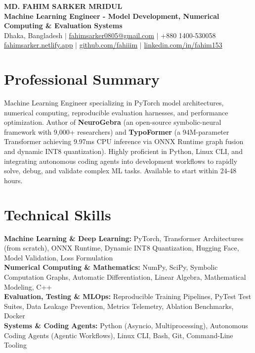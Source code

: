 \documentclass[9.5pt,a4paper]{article}
\begin{document}
{\centering
    {\Large \textbf{MD. FAHIM SARKER MRIDUL}}\\[1pt]
    \textbf{Machine Learning Engineer - Model Development, Numerical Computing \& Evaluation Systems}\\[1pt]
    Dhaka, Bangladesh \;$\vert$\; \href{mailto:fahimsarker0805@gmail.com}{fahimsarker0805@gmail.com} \;$\vert$\; +880 1400-530058\\[1pt]
    \href{https://fahimsarker.netlify.app}{fahimsarker.netlify.app} \;$\vert$\; \href{https://github.com/fahiiim}{github.com/fahiiim} \;$\vert$\; \href{https://linkedin.com/in/fahim153}{linkedin.com/in/fahim153}\par
}

\vspace{-4pt}
\section*{Professional Summary}
Machine Learning Engineer specializing in PyTorch model architectures, numerical computing, reproducible evaluation harnesses, and performance optimization. Author of \textbf{NeuroGebra} (an open-source symbolic-neural framework with 9,000+ researchers) and \textbf{TypoFormer} (a 94M-parameter Transformer achieving 9.97ms CPU inference via ONNX Runtime graph fusion and dynamic INT8 quantization). Highly proficient in Python, Linux CLI, and integrating autonomous coding agents into development workflows to rapidly solve, debug, and validate complex ML tasks. Available to start within 24-48 hours.

\section*{Technical Skills}
\noindent
\textbf{Machine Learning \& Deep Learning:} PyTorch, Transformer Architectures (from scratch), ONNX Runtime, Dynamic INT8 Quantization, Hugging Face, Model Validation, Loss Formulation\\
\textbf{Numerical Computing \& Mathematics:} NumPy, SciPy, Symbolic Computation Graphs, Automatic Differentiation, Linear Algebra, Mathematical Modeling, C++\\
\textbf{Evaluation, Testing \& MLOps:} Reproducible Training Pipelines, PyTest Test Suites, Data Leakage Prevention, Metrics Telemetry, Ablation Benchmarks, Docker\\
\textbf{Systems \& Coding Agents:} Python (Asyncio, Multiprocessing), Autonomous Coding Agents (Agentic Workflows), Linux CLI, Bash, Git, Command-Line Tooling
\end{document}
